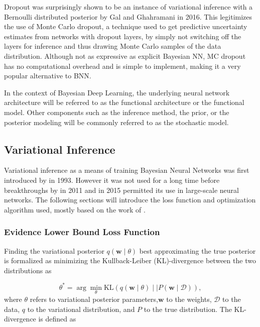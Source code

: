 	Dropout was surprisingly shown to be an instance of variational inference with a Bernoulli distributed posterior by Gal and Ghahramani\citet{gal_dropout_2016} in 2016. This legitimizes the use of Monte Carlo dropout, a technique used to get predictive uncertainty estimates from networks with dropout layers, by simply not switching off the layers for inference and thus drawing Monte Carlo samples of the data distribution. Although not as expressive as explicit Bayesian NN, MC dropout has no computational overhead and is simple to implement, making it a very popular alternative to BNN. 
	
	In the context of Bayesian Deep Learning, the underlying neural network architecture will be referred to as the functional architecture or the functional model. Other components such as the inference method, the prior,  or the posterior modeling will be commonly referred to as the stochastic model. 
	
	

\subsection{Variational Inference}
\label{section:vi}


	Variational inference as a means of training Bayesian Neural Networks was first introduced by \citet{hinton_keeping_1993} in 1993. However it was not used for a long time before breakthroughs by \citet{graves_practical_2011} in 2011 and \citet{blundell_weight_2015} in 2015 permitted its use in large-scale neural networks. The following sections will introduce the loss function and optimization algorithm used, mostly based on the work of \citet{blundell_weight_2015}.
	
	\subsubsection*{Evidence Lower Bound Loss Function}
	Finding the variational posterior $q(\pmb{w} \mid \theta)$ best approximating the true posterior is formalized as minimizing the Kullback-Leiber (KL)-divergence between the two distributions as 
	
	\begin{equation}
		\label{eq:kl}
		\theta^* = \arg \min_{\theta} \mathrm{KL}
		(
		q(\pmb{w} \mid \theta) 
		\mid \mid 
		P(\pmb{w} \mid \mathcal{D})
		),
	\end{equation}
	where $\theta$ refers to variational posterior parameters,$\pmb{w}$ to the weights, $\mathcal{D}$ to the data, $q$ to the variational distribution, and $P$ to the true distribution. The KL-divergence is defined as
	
